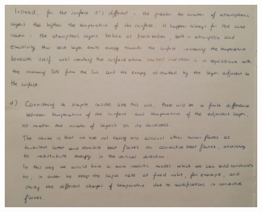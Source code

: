 \documentclass[11pt,a4paper]{article}
\begin{document}
\begin{figure}[H]
	\centering 
	\includegraphics[width=150mm]{images/es1_1.JPEG}
\end{figure}
	
\end{document}
